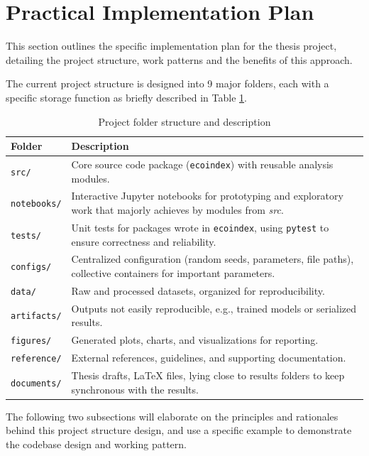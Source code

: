 \section{Practical Implementation Plan}

This section outlines the specific implementation plan for the thesis project,
detailing the project structure, work patterns and the benefits of this approach.

The current project structure is designed into 9 major folders,
each with a specific storage function as briefly described in
Table \textcolor{blue}{\ref{tab:project_structure}}.

\begin{table}[!h]
\centering
\caption{Project folder structure and description}
\label{tab:project_structure}
\renewcommand{\arraystretch}{1.3}
\begin{tabular}{p{3cm}p{10cm}}
\hline
\textbf{Folder} & \textbf{Description} \\
\hline
\texttt{src/} & Core source code package (\texttt{ecoindex}) with reusable analysis modules. \\
\texttt{notebooks/} & Interactive Jupyter notebooks for prototyping and exploratory work that majorly achieves by modules from \textit{src}. \\
\texttt{tests/} & Unit tests for packages wrote in \texttt{ecoindex}, using \texttt{pytest} to ensure correctness and reliability. \\
\texttt{configs/} & Centralized configuration (random seeds, parameters, file paths),
collective containers for important parameters. \\
\texttt{data/} & Raw and processed datasets, organized for reproducibility. \\
\texttt{artifacts/} & Outputs not easily reproducible, e.g., trained models or serialized results. \\
\texttt{figures/} & Generated plots, charts, and visualizations for reporting. \\
\texttt{reference/} & External references, guidelines, and supporting documentation. \\
\texttt{documents/} & Thesis drafts, LaTeX files, lying close to results folders to keep
synchronous with the results.\\
\hline
\end{tabular}
\end{table}

The following two subsections will elaborate on the principles and rationales behind this project structure design,
and use a specific example to demonstrate the codebase design and working pattern.

